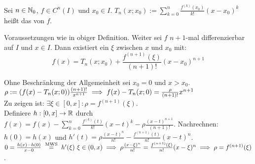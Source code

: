 \documentclass[a4paper,twoside,DIV15,BCOR12mm]{scrbook}
\begin{document}
\begin{definition}
Sei $n\in\mathbb{N}_0$, $f\in C^n(I)$ und $x_0 \in I$. $T_n(x;x_0) := \sum_{k=0}^n \frac{f^{(k)}(x_0)}{k!}(x-x_0)^k$ heißt das  von $f$.
\end{definition}

\begin{satz}
Voraussetzungen wie in obiger Definition. Weiter sei $f$ $n+1$-mal differenzierbar auf $I$ und $x\in I$. Dann existiert ein $\xi$ zwischen $x$ und $x_0$ mit:
$$ f(x) = T_n(x;x_0) + \frac{f^{(n+1)}(\xi)}{(n+1)!}(x-x_0)^{n+1}$$
\end{satz}

\begin{beweis}
Ohne Beschränkung der Allgemeinheit sei $x_0 = 0$ und $x>x_0$.\\
$\rho := (f(x) - T_n(x;0)) \frac{(n+1)!}{x^{n+1}} \implies f(x) - T_n(x;0) = \frac{\rho}{(n+1)!}x^{n+1}$\\
Zu zeigen ist: $\exists \xi\in[0,x]: \rho = f^{(n+1)}(\xi).$ \\
Definiere $h: [0,x]\to \mathbb{R}$ durch $f(x) = f(x) - \sum_{k=0}^n \frac{f^{(k)}(t)}{k!} (x-t)^k - \rho\frac{(x-t)^{n+1}}{(n+1)!}$. 
Nachrechnen: $h(0) = h(x)$ und $h'(t) = \rho\frac{(x-t)^n}{n!} - \frac{f^{(n+1)}(t)}{n!}(x-t)^n$. \\
$0 = \frac{h(x)-h(0)}{x-0} \gleichnach{MWS} h'(\xi) \ \xi \in (0,x) \folgt \rho\frac{(x-\xi)^n}{n!} = \frac{f^{(n+1)}(\xi)}{n!}(x-\xi)^n \folgt \rho = f^{(n+1)}(\xi)$.
\end{beweis}
\end{document}

